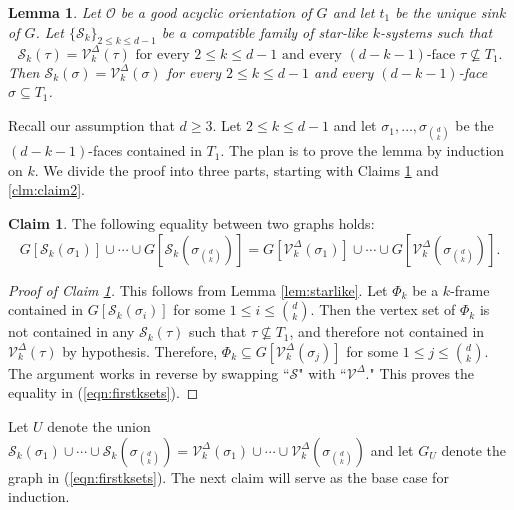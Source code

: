 \documentclass[11pt,twoside]{article}
\newtheorem{lemma}[theorem]{Lemma}
\theoremstyle{definition}
\newtheorem{claim}{Claim}[theorem]
\newcommand{\cS}{\mathcal{S}}
\newcommand{\cO}{\mathcal{O}}
\newcommand{\cV}{\mathcal{V}}
\begin{document}
\begin{lemma}\label{lem:firstfacet}
Let $\cO$ be a good acyclic orientation of $G$ and let $t_1$ be the unique sink of $G$. Let $\{\cS_k\}_{2 \le k \le d-1}$ be a compatible family of star-like $k$-systems such that 
\[
\cS_k(\tau) = \cV^\Delta_k(\tau)\text{ for every }2 \le k \le d-1\text{ and every }(d-k-1)\text{-face }\tau \nsubseteq T_1.
\]
Then $\cS_k(\sigma) = \cV^\Delta_k(\sigma)$ for every $2 \le k \le d-1$ and every $(d-k-1)$-face $\sigma \subseteq T_1$.
\end{lemma}
Recall our assumption that $d \ge 3$. Let $2 \le k \le d-1$ and let $\sigma_1, \dots, \sigma_{{d \choose k}}$ be the $(d-k-1)$-faces contained in $T_1$. The plan is to prove the lemma by induction on $k$. We divide the proof into three parts, starting with Claims \ref{clm:claim1} and \ref{clm:claim2}. 
\begin{claim}\label{clm:claim1}
    The following equality between two graphs holds:
    \begin{equation}\label{eqn:firstksets}
    G[\cS_k(\sigma_1)] \cup \cdots \cup G[\cS_k(\sigma_{{d \choose k}})] = G[\cV^\Delta_k(\sigma_1)] \cup \cdots \cup G[\cV^\Delta_k(\sigma_{{d \choose k}})].
\end{equation}
\end{claim}
\begin{proof}[Proof of Claim \ref{clm:claim1}]
This follows from Lemma \ref{lem:starlike}. Let $\Phi_k$ be a $k$-frame contained in $G[\cS_k(\sigma_i)]$ for some $1 \le i \le {d \choose k}$. Then the vertex set of $\Phi_k$ is not contained in any $\cS_k(\tau)$ such that $\tau \nsubseteq T_1$, and therefore not contained in $\cV^\Delta_k(\tau)$ by hypothesis. Therefore, $\Phi_k \subseteq G[\cV^\Delta_k(\sigma_j)]$ for some $1 \le j \le {d \choose k}$. The argument works in reverse by swapping ``$\cS$" with ``$\cV^\Delta$." This proves the equality in (\ref{eqn:firstksets}).  
\end{proof}
Let $U$ denote the union $\cS_k(\sigma_1) \cup \cdots \cup \cS_k(\sigma_{{d \choose k}}) = \cV^\Delta_k(\sigma_1) \cup \cdots \cup \cV^\Delta_k(\sigma_{{d \choose k}})$ and let $G_U$ denote the graph in (\ref{eqn:firstksets}). The next claim will serve as the base case for induction. 
\end{document}
